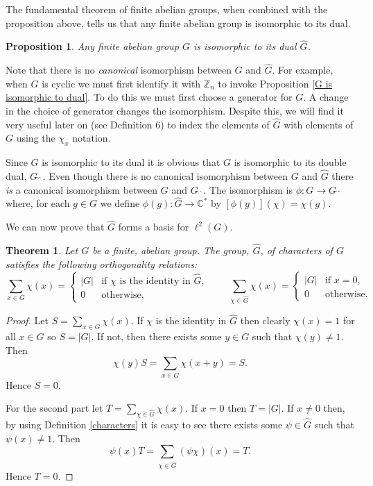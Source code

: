 \documentclass[12pt]{article}
\newtheorem{Proposition}{Proposition}
\newtheorem{Theorem}{Theorem}
\newcommand{\Z}{\mathbb{Z}}
\newcommand{\C}{\mathbb{C}}
\begin{document}
The fundamental theorem of finite abelian groups, when combined with the proposition above, tells us that any finite abelian group is isomorphic to its dual.

\begin{Proposition}
    Any finite abelian group $G$ is isomorphic to its dual $\widehat{G}$.
\end{Proposition}

Note that there is no \emph{canonical} isomorphism between $G$ and $\widehat{G}$.
For example, when $G$ is cyclic we must first identify it with $\Z_n$ to invoke Proposition \ref{G is isomorphic to dual}.
To do this we must first choose a generator  for $G$.
A change in the choice of generator changes the isomorphism.
Despite this, we will find it very useful later on (see Definition 6) to index the elements of $\widehat{G}$ with elements of $G$ using the $\chi_x$ notation.

Since $G$ is isomorphic to its dual it is obvious that $G$ is isomorphic to its double dual, $G\hat{\;}\hat{\;}$.
Even though there is no canonical isomorphism between $G$ and $\widehat{G}$ there \emph{is} a canonical isomorphism between $G$ and $G\hat{\;}\hat{\;}$.
The isomorphism is $\phi:G \to G\hat{\;}\hat{\;}$ where, for each $g\in G$ we define $\phi(g):\widehat{G}\to \C^*$ by $[\phi(g)](\chi) = \chi(g)$.

We can now prove that $\widehat{G}$ forms a basis for $\ell^2(G)$.

\begin{Theorem} \label{orthogonality} %
    Let $G$ be a finite, abelian group.
    The group, $\widehat{G}$, of characters of $G$ satisfies the following orthogonality relations:
    \[
        \sum_{x\in G}\chi(x)
        =
        \begin{cases}
            |G| & \text{if }\chi \text{ is the identity in  }\widehat{G}, \\
            0   & \text{otherwise},
        \end{cases}
        \qquad
        \sum_{\chi\in \hat{G}}\chi(x)=
        \begin{cases}
            |G| & \text{if }x=0,    \\
            0   & \text{otherwise}.
        \end{cases}
    \]
\end{Theorem}
\begin{proof}
    Let $S=\sum_{x\in G}\chi(x)$.
    If $\chi$ is the identity in $\widehat{G}$ then clearly $\chi(x) = 1$ for all $x\in G$ so $S=|G|$.
    If not, then there exists some $y\in G$ such that $\chi(y)\neq 1$.
    Then
    \[
        \chi(y)S=\sum_{x\in G}\chi(x+y)=S.
    \]
    Hence $S=0$.

    For the second part let $T=\sum_{\chi\in \hat{G}}\chi(x)$.
    If $x=0$ then $T=|G|$.
    If $x\neq 0$ then, by using Definition \ref{characters} it is easy to see there exists some $\psi \in \widehat{G}$ such that $\psi(x)\neq 1$.
    Then
    \[
        \psi(x)T=\sum_{\chi\in \hat{G}}(\psi\chi)(x)=T.
    \]
    Hence $T=0$.
\end{proof}
\end{document}
